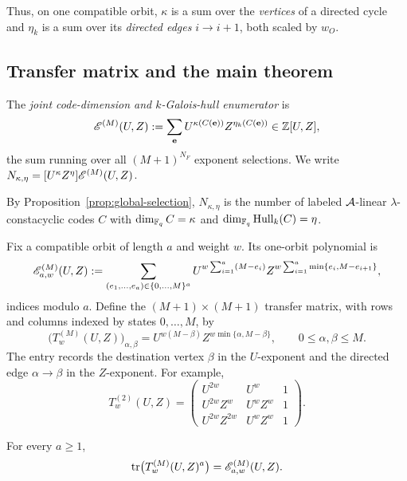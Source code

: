 Thus, on one compatible orbit, $\kappa$ is a sum over the \emph{vertices} of a
directed cycle and $\eta_k$ is a sum over its \emph{directed edges}
$i\to i+1$, both scaled by $w_O$.

\subsection{Transfer matrix and the main theorem}\label{sec:transfer}

\begin{definition}\label{def:enumerator}
The \emph{joint code-dimension and $k$-Galois-hull enumerator} is
\[
\mathscr E^{(M)}(U,Z)
   :=\sum_{\mathbf{e}}U^{\kappa(C(\mathbf{e}))}
                      Z^{\eta_k(C(\mathbf{e}))}
   \in\mathbb{Z}[U,Z],
\]
the sum running over all $(M+1)^{N_F}$ exponent selections.  We write
$N_{\kappa,\eta}=[U^\kappa Z^\eta]\mathscr E^{(M)}(U,Z)$.
\end{definition}

By Proposition~\ref{prop:global-selection}, $N_{\kappa,\eta}$ is the number of
labeled $\mathcal A$-linear $\lambda$-constacyclic codes $C$ with
$\dim_{\mathbb F_q}C=\kappa$ and $\dim_{\mathbb F_q}\operatorname{Hull}_k(C)=\eta$.

Fix a compatible orbit of length $a$ and weight $w$.  Its one-orbit polynomial
is
\begin{equation}\label{eq:one-orbit-poly}
\mathscr E_{a,w}^{(M)}(U,Z)
 :=\sum_{(e_1,\ldots,e_a)\in\{0,\ldots,M\}^a}
   U^{w\sum_{i=1}^{a}(M-e_i)}
   Z^{w\sum_{i=1}^{a}\min\{e_i,M-e_{i+1}\}},
\end{equation}
indices modulo $a$.  Define the $(M+1)\times(M+1)$ transfer matrix, with rows
and columns indexed by states $0,\ldots,M$, by
\begin{equation}\label{eq:transfer}
\boxed{\;
\bigl(T^{(M)}_w(U,Z)\bigr)_{\alpha,\beta}
   =U^{w(M-\beta)}Z^{w\min\{\alpha,M-\beta\}},
\qquad 0\leq\alpha,\beta\leq M.\;}
\end{equation}
The entry records the destination vertex $\beta$ in the $U$-exponent and the
directed edge $\alpha\to\beta$ in the $Z$-exponent.  For example,
\[
T^{(2)}_w(U,Z)=
\begin{pmatrix}
U^{2w} & U^w & 1\\
U^{2w}Z^w & U^wZ^w & 1\\
U^{2w}Z^{2w} & U^wZ^w & 1
\end{pmatrix}.
\]

\begin{lemma}\label{lem:trace}
For every $a\geq1$,
\[
\operatorname{tr}\bigl(T^{(M)}_w(U,Z)^a\bigr)
   =\mathscr E_{a,w}^{(M)}(U,Z).
\]
\end{lemma}

